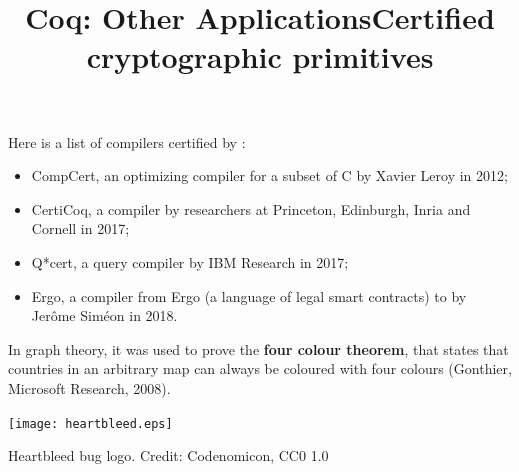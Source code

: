 \documentclass[wide]{slides}
\begin{document}
\begin{slide}
  \title{Coq: Other Applications}

  Here is a list of compilers certified by \Coq:
  \begin{itemize}

    \item \textsf{CompCert}, an optimizing compiler for a subset of C
      by Xavier Leroy in 2012;

    \item \textsf{CertiCoq}, a compiler by researchers at Princeton,
      Edinburgh, Inria and Cornell in 2017;

    \item \textsf{Q*cert}, a query compiler by IBM Research in 2017;

    \item \textsf{Ergo}, a compiler from Ergo (a language of legal
      smart contracts) to \Michelson by Jerôme Siméon in 2018.

  \end{itemize}

   In graph theory, it was used to prove the \textbf{four colour
     theorem}, that states that countries in an arbitrary map can
   always be coloured with four colours (Gonthier, Microsoft Research,
   2008).

\end{slide}

\begin{slide}
  \title{Certified cryptographic primitives}

  \begin{center}
    \texttt{[image: heartbleed.eps]}
  \end{center}

  \centerline{Heartbleed bug logo. Credit: Codenomicon, CC0 1.0}

\end{slide}
\end{document}
